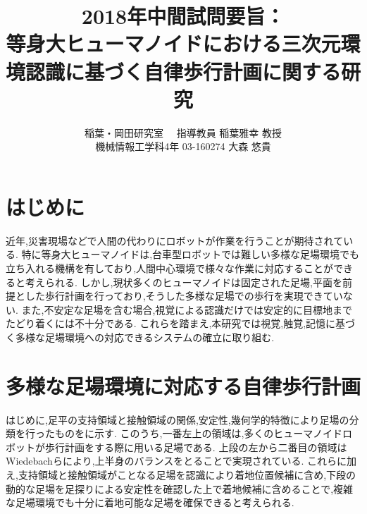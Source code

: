 \documentclass[twocolumn]{preport}
\title{2018年中間試問要旨：\\
等身大ヒューマノイドにおける三次元環境認識に基づく自律歩行計画に関する研究}
\author{稲葉・岡田研究室 　指導教員 稲葉雅幸 教授\\
  機械情報工学科4年 03-160274 大森 悠貴 }
\begin{document}
\pagestyle{empty}
\maketitle
\thispagestyle{empty}
\sloppy

\section{はじめに}



近年,災害現場などで人間の代わりにロボットが作業を行うことが期待されている.
特に等身大ヒューマノイドは,台車型ロボットでは難しい多様な足場環境でも立ち入れる機構を有しており,人間中心環境で様々な作業に対応することができると考えられる.
しかし,現状多くのヒューマノイドは固定された足場,平面を前提とした歩行計画を行っており,そうした多様な足場での歩行を実現できていない.
また,不安定な足場を含む場合,視覚による認識だけでは安定的に目標地までたどり着くには不十分である.
これらを踏まえ,本研究では視覚,触覚,記憶に基づく多様な足場環境への対応できるシステムの確立に取り組む.


\section{多様な足場環境に対応する自律歩行計画}

はじめに,足平の支持領域と接触領域の関係,安定性,幾何学的特徴により足場の分類を行ったものをに示す.
このうち,一番左上の領域は,多くのヒューマノイドロボットが歩行計画をする際に用いる足場である.
上段の左から二番目の領域はWiedebachら\cite{wiedebach2016walking}により,上半身のバランスをとることで実現されている.
これらに加え,支持領域と接触領域がことなる足場を認識により着地位置候補に含め,下段の動的な足場を足探りによる安定性を確認した上で着地候補に含めることで,複雑な足場環境でも十分に着地可能な足場を確保できると考えられる.
\end{document}
